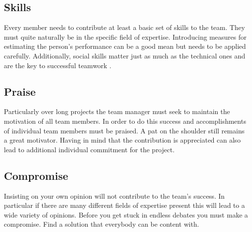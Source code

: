 \begin{multicols}{2}
\subsection{Skills}
Every member needs to contribute at least a basic set of skills to the team. They must quite naturally be in the specific field of expertise. Introducing measures for estimating the person’s performance can be a good mean but needs to be applied carefully. Additionally, social skills matter just as much as the technical ones and are the key to successful teamwork \cite{Kawasaki}.

\subsection{Praise}
Particularly over long projects the team manager must seek to maintain the motivation of all team members. In order to do this success and accomplishments of individual team members must be praised. A pat on the shoulder still remains a great motivator. Having in mind that the contribution is appreciated can also lead to additional individual commitment  for the project.

\subsection{Compromise}
Insisting on your own opinion will not contribute to the team’s success. In particular if there are many different fields of expertise present this will lead to a wide variety of opinions. Before you get stuck in endless debates you must make a compromise. Find a solution that everybody can be content with.
\end{multicols}